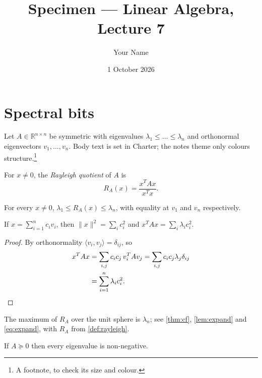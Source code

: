 \documentclass[11pt]{article}
\title{Specimen — Linear Algebra, Lecture 7}
\author{Your Name}
\date{1 October 2026}
\begin{document}
\maketitle

\section{Spectral bits}

Let $A \in \mathbb{R}^{n \times n}$ be symmetric with eigenvalues
$\lambda_1 \le \dots \le \lambda_n$ and orthonormal eigenvectors $v_1, \dots, v_n$.
Body text is set in Charter; the notes theme only colours structure.\footnote{A footnote, to check its size and colour.}

\begin{definition}
\label{def:rayleigh}
For $x \neq 0$, the \emph{Rayleigh quotient} of $A$ is
\[
  R_A(x) = \frac{x^{T} A x}{x^{T} x}.
\]
\end{definition}

\begin{theorem}
\label{thm:cf}
For every $x \ne 0$, $\lambda_1 \le R_A(x) \le \lambda_n$, with equality at
$v_1$ and $v_n$ respectively.
\end{theorem}

\begin{lemma}
\label{lem:expand}
If $x = \sum_{i=1}^{n} c_i v_i$, then $\lVert x \rVert^{2} = \sum_{i} c_i^{2}$ and
$x^{T} A x = \sum_{i} \lambda_i c_i^{2}$.
\end{lemma}

\begin{proof}
By orthonormality $\langle v_i, v_j \rangle = \delta_{ij}$, so
\begin{align}
  x^{T} A x &= \sum_{i,j} c_i c_j \, v_i^{T} A v_j
             = \sum_{i,j} c_i c_j \lambda_j \delta_{ij} \label{eq:expand} \\
            &= \sum_{i=1}^{n} \lambda_i c_i^{2}. \qedhere
\end{align}
\end{proof}

\begin{proposition}
The maximum of $R_A$ over the unit sphere is $\lambda_n$; see \cref{thm:cf}, \cref{lem:expand} and \eqref{eq:expand}, with $R_A$ from \cref{def:rayleigh}.
\end{proposition}

\begin{corollary}
If $A \succeq 0$ then every eigenvalue is non-negative.
\end{corollary}
\end{document}
